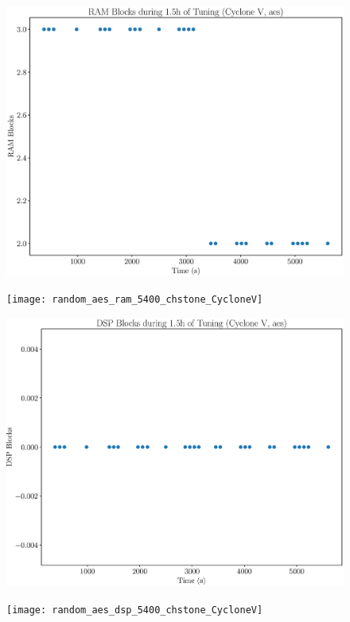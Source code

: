 \documentclass[12pt, a4paper]{article}
\begin{document}
\begin{figure}[htpb]
    \centering
    \noindent
    \begin{minipage}{.48\textwidth}
        \centering
        \includegraphics[scale=.25]{aes_ram_5400_chstone_CycloneV}
    \end{minipage}%
    \hfill
    \begin{minipage}{.48\textwidth}
        \centering
        \texttt{[image: random\_aes\_ram\_5400\_chstone\_CycloneV]}
    \end{minipage}%

    \begin{minipage}{.48\textwidth}
        \includegraphics[scale=.25]{aes_dsp_5400_chstone_CycloneV}
    \end{minipage}%
    \hfill
    \begin{minipage}{.48\textwidth}
        \texttt{[image: random\_aes\_dsp\_5400\_chstone\_CycloneV]}
    \end{minipage}%


\end{figure}
\end{document}
